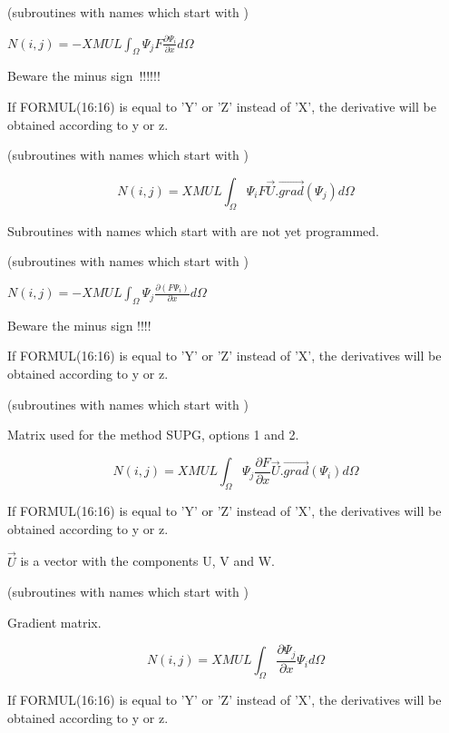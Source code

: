 (subroutines with names which start with )

$N(i,j)=-XMUL \int _{\Omega }
\Psi _{j}  F \frac{\partial \Psi _{i} }{\partial x} d\Omega$

Beware the minus sign~!!!!!!

If FORMUL(16:16) is equal to 'Y' or 'Z' instead of 'X', the derivative will be
obtained according to y or z.


(subroutines with names which start with )

\[N(i,j)=XMUL \int _{\Omega }\Psi _{i}  F\vec{U} . \overrightarrow{grad} (\Psi _{j} )d\Omega  \]

Subroutines with names which start with  are not yet programmed.


(subroutines with names which start with )

$N(i,j)=-XMUL \int _{\Omega }\Psi _{j} \frac{\partial (F \Psi _{i} )}{\partial x} d\Omega  $

Beware the minus sign !!!!

If FORMUL(16:16) is equal to 'Y' or 'Z' instead of 'X', the derivatives will be
obtained according to y or z.


(subroutines with names which start with )

Matrix used for the method SUPG, options 1 and 2.

\[N(i,j)=XMUL \int _{\Omega }
\Psi _{j} \frac{\partial F}{\partial x}
\vec{U} . \overrightarrow{grad} (\Psi _{i} )d\Omega \]

If FORMUL(16:16) is equal to 'Y' or 'Z' instead of 'X', the derivatives will be
obtained according to y or z.

$\vec{U}$ is a vector with the components U, V and W.


(subroutines with names which start with )

Gradient matrix.

\[N(i,j)=XMUL \int _{\Omega } \frac{\partial \Psi _{j} }{\partial x} \Psi _{i} d\Omega  \]

If FORMUL(16:16) is equal to 'Y' or 'Z' instead of 'X', the derivatives will be
obtained according to y or z.

